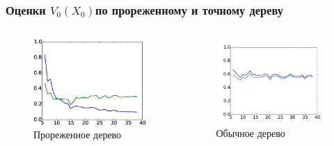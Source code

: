 \documentclass[unicode, notheorems]{beamer}
\begin{document}
\begin{frame}\frametitle{Оценки $V_0(X_0)$по прореженному и точному дереву}
    \begin{columns}
        \begin{column}{0.5\textwidth}
            \begin{figure}
                \centering
                \includegraphics[width=\linewidth]{true_value_test_empiric_distr}
                \caption{Прореженное дерево}
                \label{fig:true_value_test_empiric_distrib}
            \end{figure}
        \end{column}
        \begin{column}{0.5\textwidth}
            \begin{figure}
                \centering
                \includegraphics[width=\linewidth]{true_value_test_standard.pdf}
                \caption{Обычное дерево}
                \label{fig:true_value_test_standard}
            \end{figure}
    \end{column}
\end{columns}
\end{frame}
\end{document}
